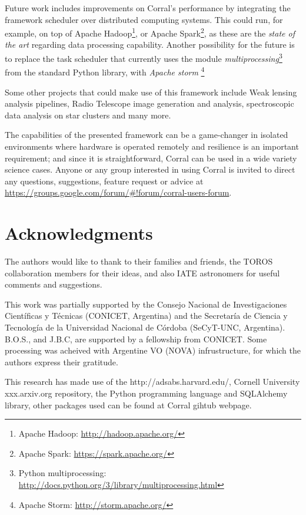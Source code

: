\documentclass[final,5p,times,twocolumn,authoryear]{elsarticle}
\begin{document}
Future work includes improvements on Corral's performance
by integrating the framework scheduler over distributed
computing systems.
%
This could run, for example, on top of 
Apache Hadoop\footnote{Apache Hadoop: \url{http://hadoop.apache.org/}}, or 
Apache Spark\footnote{Apache Spark: \url{https://spark.apache.org/}},
as these are the \textit{state of the art} regarding
data processing capability.
%
Another possibility for the future is to replace the task scheduler
that currently uses the module \textit{multiprocessing}\footnote{Python multiprocessing:
\url{http://docs.python.org/3/library/multiprocessing.html}}
from the standard Python library, with \textit{Apache storm}
\footnote{Apache Storm: \url{http://storm.apache.org/}}

Some other projects that could make use of this framework include
Weak lensing analysis pipelines, Radio Telescope image
generation and analysis, spectroscopic data analysis on star clusters
and many more.

The capabilities of the presented framework can
be a game-changer in isolated environments where
hardware is operated remotely and resilience is
an important requirement; and since it is
straightforward, Corral  can be used in a wide
variety science cases.
%
Anyone or any group interested in using Corral is
invited to direct any questions, suggestions,
feature request or advice at
\url{https://groups.google.com/forum/#!forum/corral-users-forum}.

\section{Acknowledgments}
The authors would like to thank to their families and friends, the TOROS collaboration
members for their ideas, and also IATE
astronomers for useful comments and suggestions.

This work was partially supported by the Consejo Nacional
de Investigaciones Cient\'ificas y T\'ecnicas (CONICET, Argentina)
and the Secretaría de Ciencia y Tecnolog\'ia de la Universidad
Nacional de C\'ordoba (SeCyT-UNC, Argentina).
B.O.S., and J.B.C, are supported by a fellowship from CONICET.
Some processing was acheived with Argentine VO (NOVA) infrustructure,
for which the authors express their gratitude.

This research has made use of the
http://adsabs.harvard.edu/, Cornell University xxx.arxiv.org repository,
the Python programming language and SQLAlchemy library,
other packages used can be found at
Corral gihtub webpage.
\end{document}
